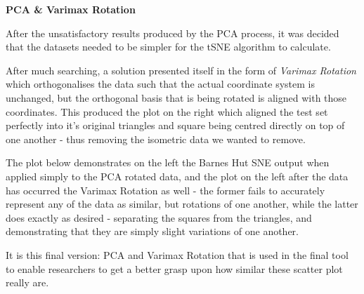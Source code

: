 \documentclass[a4paper,11pt,titlepage]{article}
\begin{document}
	\textbf{PCA \& Varimax Rotation}
	\par
	After the unsatisfactory results produced by the PCA process, it was decided that the datasets needed to be simpler for the tSNE algorithm to calculate. 
	\par 
	After much searching, a solution presented itself in the form of \textit{Varimax Rotation} \cite{Lin2012} which orthogonalises the data such that the actual coordinate system is unchanged, but the orthogonal basis that is being rotated is aligned with those coordinates. This produced the plot on the right which aligned the test set perfectly into it's original triangles and square being centred directly on top of one another - thus removing the isometric data we wanted to remove.
	\par 
	The plot below demonstrates on the left the Barnes Hut SNE output when applied simply to the PCA rotated data, and the plot on the left after the data has occurred the Varimax Rotation as well - the former fails to accurately represent any of the data as similar, but rotations of one another, while the latter does exactly as desired - separating the squares from the triangles, and demonstrating that they are simply slight variations of one another.

	\begin{figure}[H]
    			\centering	
    			 \qquad
    			\caption{}%
    			\label{fig:pca_varimax}
	\end{figure}


	It is this final version: PCA and Varimax Rotation that is used in the final tool to enable researchers to get a better grasp upon how similar these scatter plot really are.
	
\end{document}
